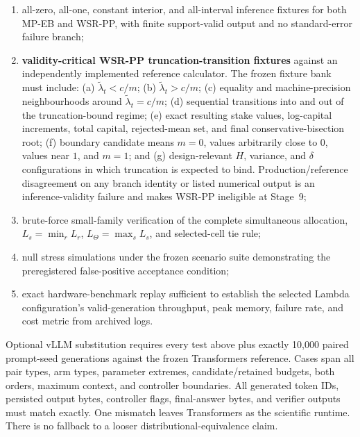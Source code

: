\documentclass[11pt,a4paper]{article}
\begin{document}
\begin{enumerate}
\item all-zero, all-one, constant interior, and all-interval inference fixtures for both MP-EB and WSR-PP, with finite support-valid output and no standard-error failure branch;
\item \textbf{validity-critical WSR-PP truncation-transition fixtures} against an independently implemented reference calculator. The frozen fixture bank must include: (a) $\widetilde\lambda_t<c/m$; (b) $\widetilde\lambda_t>c/m$; (c) equality and machine-precision neighbourhoods around $\widetilde\lambda_t=c/m$; (d) sequential transitions into and out of the truncation-bound regime; (e) exact resulting stake values, log-capital increments, total capital, rejected-mean set, and final conservative-bisection root; (f) boundary candidate means $m=0$, values arbitrarily close to $0$, values near $1$, and $m=1$; and (g) design-relevant $H$, variance, and $\delta$ configurations in which truncation is expected to bind. Production/reference disagreement on any branch identity or listed numerical output is an inference-validity failure and makes WSR-PP ineligible at Stage~9;
\item brute-force small-family verification of the complete simultaneous allocation, $L_s=\min_rL_r$, $L_\Theta=\max_sL_s$, and selected-cell tie rule;
\item null stress simulations under the frozen scenario suite demonstrating the preregistered false-positive acceptance condition;
\item exact hardware-benchmark replay sufficient to establish the selected Lambda configuration's valid-generation throughput, peak memory, failure rate, and cost metric from archived logs.
\end{enumerate}

Optional vLLM substitution requires every test above plus exactly 10,000 paired prompt-seed generations against the frozen Transformers reference. Cases span all pair types, arm types, parameter extremes, candidate/retained budgets, both orders, maximum context, and controller boundaries. All generated token IDs, persisted output bytes, controller flags, final-answer bytes, and verifier outputs must match exactly. One mismatch leaves Transformers as the scientific runtime. There is no fallback to a looser distributional-equivalence claim.
\end{document}
